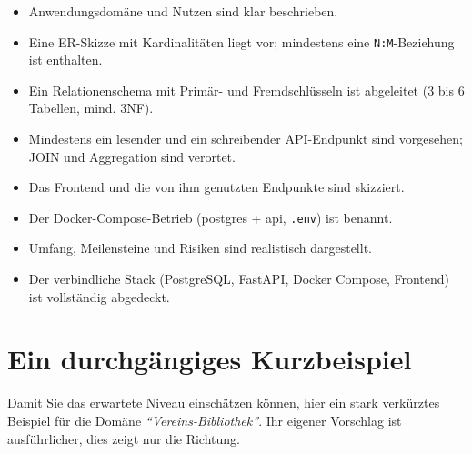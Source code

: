 \documentclass[11pt,a4paper]{article}
\begin{document}
\begin{itemize}[leftmargin=1.8em, label=$\square$]
  \item Anwendungsdomäne und Nutzen sind klar beschrieben.
  \item Eine ER-Skizze mit Kardinalitäten liegt vor; mindestens eine
        \texttt{N:M}-Beziehung ist enthalten.
  \item Ein Relationenschema mit Primär- und Fremdschlüsseln ist abgeleitet
        (3 bis 6 Tabellen, mind. 3NF).
  \item Mindestens ein lesender und ein schreibender API-Endpunkt sind
        vorgesehen; JOIN und Aggregation sind verortet.
  \item Das Frontend und die von ihm genutzten Endpunkte sind skizziert.
  \item Der Docker-Compose-Betrieb (postgres + api, \texttt{.env}) ist benannt.
  \item Umfang, Meilensteine und Risiken sind realistisch dargestellt.
  \item Der verbindliche Stack (PostgreSQL, FastAPI, Docker Compose, Frontend)
        ist vollständig abgedeckt.
\end{itemize}

\section{Ein durchgängiges Kurzbeispiel}

Damit Sie das erwartete Niveau einschätzen können, hier ein stark verkürztes
Beispiel für die Domäne \emph{``Vereins-Bibliothek''}. Ihr eigener Vorschlag ist
ausführlicher, dies zeigt nur die Richtung.
\end{document}
